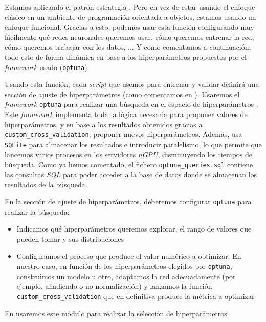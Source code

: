 Estamos aplicando el patrón estrategia \cite{informatica:design_patterns} \cite{informatica:strategy_pattern_web}. Pero en vez de estar usando el enfoque clásico en un ambiente de programación orientada a objetos, estamos usando un enfoque funcional. Gracias a esto, podemos usar esta función configurando muy fácilmente qué redes neuronales queremos usar, cómo queremos entrenar la red, cómo queremos trabajar con los datos, ... Y como comentamos a continuación, todo esto de forma dinámica en base a los hiperparámetros propuestos por el \textit{framework} usado (\lstinline{optuna}).

Usando esta función, cada \textit{script} que usemos para entrenar y validar definirá una sección de ajuste de hiperparámetros (como comentamos en ). Usaremos el \textit{framework} \lstinline{optuna} para realizar una búsqueda en el espacio de hiperparámetros \cite{informatica:optuna_web}. Este \textit{framework} implementa toda la lógica necesaria para proponer valores de hiperparámetros, y en base a los resultados obtenidos gracias a \lstinline{custom_cross_validation}, proponer nuevos hiperparámetros. Además, usa \lstinline{SQLite} para almacenar los resultados e introducir paralelismo, lo que permite que lancemos varios procesos en los servidores \textit{nGPU}, disminuyendo los tiempos de búsqueda. Como ya hemos comentado, el fichero \lstinline{optuna_queries.sql} contiene las consultas \textit{SQL} para poder acceder a la base de datos donde se almacenan los resultados de la búsqueda.

En la sección de ajuste de hiperparámetros, deberemos configurar \lstinline{optuna} para realizar la búsqueda:

\begin{itemize}
    \item Indicamos qué hiperparámetros queremos explorar, el rango de valores que pueden tomar y sus distribuciones
    \item Configuramos el proceso que produce el valor numérico a optimizar. En nuestro caso, en función de los hiperparámetros elegidos por \lstinline{optuna}, construimos un modelo u otro, adaptamos la red adecuadamente (por ejemplo, añadiendo o no normalización) y lanzamos la función \lstinline{custom_cross_validation} que en definitiva produce la métrica a optimizar
\end{itemize}

En  usaremos este módulo para realizar la selección de hiperparámetros.

